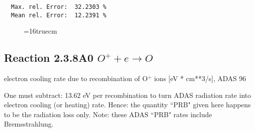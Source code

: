 \documentclass[12pt,dvipdfmx]{article}
\begin{document}
\begin{small}
\begin{verbatim}
  Max. rel. Error:  32.2303 %
  Mean rel. Error:  12.2391 %

\end{verbatim}\end{small}
\begin{figure} \label{2.3.7rl}
\epsfxsize=16truecm 
\end{figure}
\newpage

\subsection{
  Reaction 2.3.8A0  $O^+ + e \rightarrow O   $
}
electron cooling rate due to recombination of O$^+$ ions [eV *
cm**3/s], ADAS 96

One must subtract: 13.62 eV per recombination to turn ADAS radiation
rate into electron cooling (or heating) rate. Hence: the quantity
``PRB" given here happens to be the radiation loss only. Note: these
ADAS ``PRB" rates include Bremsstrahlung.
\end{document}
